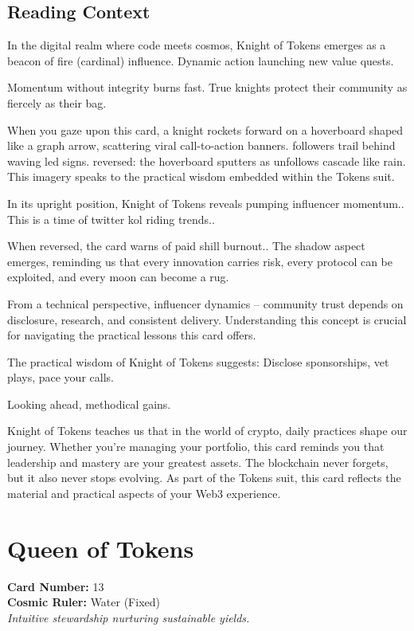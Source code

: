 \documentclass[11pt,oneside]{book}
\begin{document}
\begin{minipage}[t]{0.55\textwidth}
  \subsection*{Reading Context}
  In the digital realm where code meets cosmos, Knight of Tokens emerges as a beacon of fire (cardinal) influence. Dynamic action launching new value quests.

  Momentum without integrity burns fast. True knights protect their community as fiercely as their bag.

  When you gaze upon this card, a knight rockets forward on a hoverboard shaped like a graph arrow, scattering viral call-to-action banners. followers trail behind waving led signs. reversed: the hoverboard sputters as unfollows cascade like rain. This imagery speaks to the practical wisdom embedded within the Tokens suit.

  In its upright position, Knight of Tokens reveals pumping influencer momentum.. This is a time of twitter kol riding trends..

  When reversed, the card warns of paid shill burnout.. The shadow aspect emerges, reminding us that every innovation carries risk, every protocol can be exploited, and every moon can become a rug.

  From a technical perspective, influencer dynamics – community trust depends on disclosure, research, and consistent delivery. Understanding this concept is crucial for navigating the practical lessons this card offers.

  The practical wisdom of Knight of Tokens suggests: Disclose sponsorships, vet plays, pace your calls.

  Looking ahead, methodical gains.

  Knight of Tokens teaches us that in the world of crypto, daily practices shape our journey. Whether you're managing your portfolio, this card reminds you that leadership and mastery are your greatest assets. The blockchain never forgets, but it also never stops evolving. As part of the Tokens suit, this card reflects the material and practical aspects of your Web3 experience.

\end{minipage}

\newpage
\section*{Queen of Tokens}

\begin{minipage}[t]{0.55\textwidth}
  \vspace{0pt}
  \textbf{Card Number:} 13\\  \textbf{Cosmic Ruler:} Water (Fixed)\\  \textit{Intuitive stewardship nurturing sustainable yields.}
\end{minipage}
\end{document}
